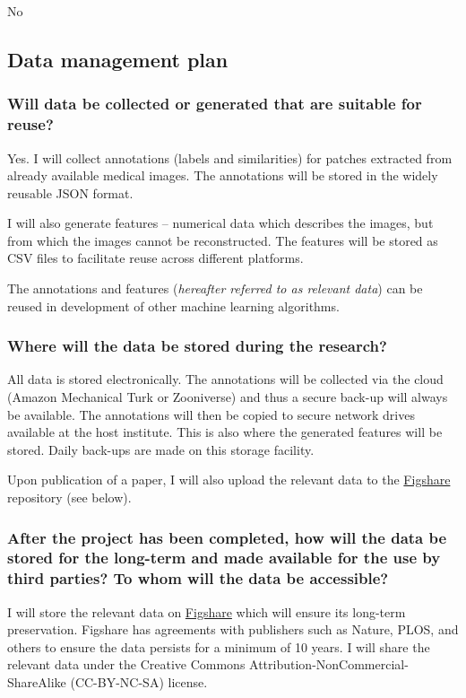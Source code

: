 \documentclass[serif, twocolumn, numeric, rga]{jote-article}
\begin{document}
No 
\subsection*{Data management plan}

\subsubsection*{Will data be collected or generated that are suitable for reuse?}

Yes. I will collect annotations (labels and similarities) for patches extracted from already available medical images. The annotations will be stored in the widely reusable JSON format.

I will also generate features -- numerical data which describes the images, but from which the images cannot be reconstructed. The features will be stored as CSV files to facilitate reuse across different platforms.

The annotations and features (\emph{hereafter referred to as relevant data}) can be reused in development of other machine learning algorithms.

\subsubsection*{Where will the data be stored during the research?}

All data is stored electronically. The annotations will be collected via the cloud (Amazon Mechanical Turk or Zooniverse) and thus a secure back-up will always be available. The annotations will then be copied to secure network drives available at the host institute. This is also where the generated features will be stored. Daily back-ups are made on this storage facility.

Upon publication of a paper, I will also upload the relevant data to the \href{http://www.figshare.com}{Figshare} repository (see below).

\subsubsection*{After the project has been completed, how will the data be stored for the long-term and made available for the use by third parties? To whom will the data be accessible?}

I will store the relevant data on \href{http://www.figshare.com}{Figshare} which will ensure its long-term preservation. Figshare has agreements with publishers such as Nature, PLOS, and others to ensure the data persists for a minimum of 10 years.
I will share the relevant data under the Creative Commons Attribution-NonCommercial-ShareAlike (CC-BY-NC-SA) license.
\end{document}
